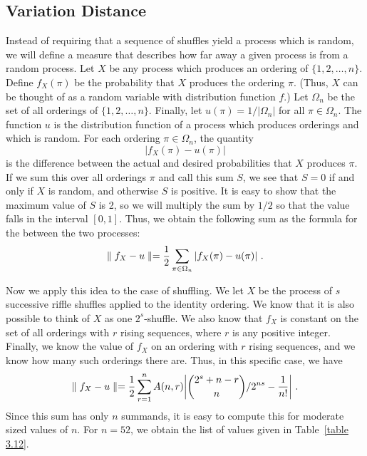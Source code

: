 \subsection*{Variation Distance}
Instead of requiring that a sequence of shuffles yield a process which is
random, we will define a measure that describes how far away a given process is from a
random process.  Let
$X$ be any process which produces an ordering of $\{1, 2, \ldots, n\}$.  Define
$f_X(\pi)$ be the probability that $X$ produces the ordering $\pi$.  (Thus, $X$ can be
thought of as a random variable with distribution function $f$.)  Let $\Omega_n$ be
the set of all orderings of $\{1, 2,
\ldots, n\}$.  Finally, let $u(\pi) = 1/|\Omega_n|$ for  all $\pi \in \Omega_n$.  The
function
$u$ is the distribution function of a process which produces orderings and which is
random.  For each ordering $\pi \in \Omega_n$, the quantity
$$|f_X(\pi) - u(\pi)|$$ is the difference between the actual and desired probabilities
that $X$ produces $\pi$.  If we sum this over all orderings $\pi$ and call this sum $S$, we see that 
$S = 0$ if and only if $X$ is random, and otherwise $S$ is positive.  It is easy
to show that the maximum value of $S$ is 2, so we will multiply the sum
by $1/2$ so that the value falls in the interval $[0, 1]$.  Thus, we obtain the
following sum as the formula for the  between the
two processes:
$$\parallel f_X - u \parallel = {1\over 2}\sum_{\pi \in \Omega_n} |f_X(\pi) - u(\pi)|\
.$$
\par  Now we apply this idea to the case of shuffling.  We let $X$ be the process of
$s$ successive riffle shuffles applied to the identity ordering.  We know that it is
also possible to think of $X$ as one $2^s$-shuffle.  We also know that $f_X$ is
constant on the set of all orderings with $r$ rising sequences, where $r$ is any
positive integer.  Finally, we know the value of $f_X$ on an ordering with $r$ rising
sequences, and we know how many such orderings there are.  Thus, in this specific
case, we have
$$\parallel f_X - u \parallel = {1\over 2}\sum_{r=1}^n A(n, r) 
\biggl|{{2^s + n - r}\choose{n}}/2^{ns} - {1\over{n!}}\biggr|\ .$$ Since this sum has
only $n$ summands, it is easy to compute this for moderate sized values of $n$.  For
$n = 52$, we obtain the list of values given in Table~\ref{table 3.12}.

